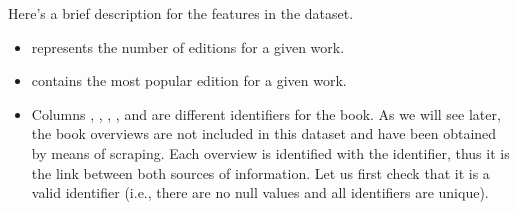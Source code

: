\documentclass[letterpaper,10pt,english]{sphinxmanual}
\begin{document}
Here’s a brief description for the features in the dataset.
\begin{itemize}
\item {} 
 represents the number of editions for a given work.

\item {} 
 contains the most popular edition for a given work.

\item {} 
Columns , , , ,  and  are different identifiers for the book. As we will see later, the book overviews are not included in this dataset and have been obtained by means of scraping. Each overview is identified with the  identifier, thus it is the link between both sources of information. Let us first check that it is a valid identifier (i.e., there are no null values and all identifiers are unique).

\end{itemize}

{
\begin{sphinxVerbatim}[commandchars=\\\{\}]
\llap{\color{nbsphinxin}[11]:\,\hspace{\fboxrule}\hspace{\fboxsep}}
\PYG{p}{[}\PYG{p}{]}
\end{sphinxVerbatim}
}
\end{document}
